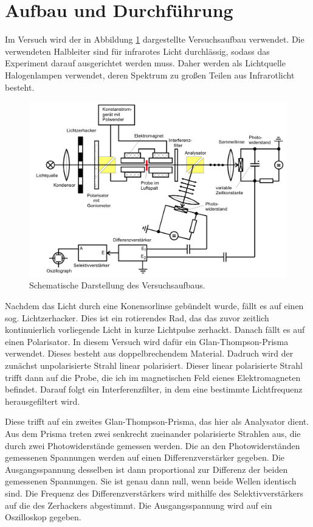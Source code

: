 \section{Aufbau und Durchführung}
\label{sec:aufbauUndDurchfuehrung}

Im Versuch wird der in Abbildung \ref{fig:aufbau} dargestellte Versuchsaufbau verwendet.
Die verwendeten Halbleiter sind für infrarotes Licht durchlässig, sodass das Experiment
darauf ausgerichtet werden muss. Daher werden als Lichtquelle Halogenlampen verwendet,
deren Spektrum zu großen Teilen aus Infrarotlicht besteht.

\begin{figure}
  \centering
  \includegraphics[width=\textwidth]{data/aufbau.png}
  \caption{Schematische Darstellung des Versuchsaufbaus. \cite{anleitung}}
  \label{fig:aufbau}
\end{figure}

Nachdem das Licht durch eine Konensorlinse gebündelt wurde, fällt es auf einen
sog. Lichtzerhacker. Dies ist ein rotierendes Rad, das das zuvor zeitlich kontinuierlich
vorliegende Licht in kurze Lichtpulse zerhackt. Danach fällt es auf einen Polarisator.
In diesem Versuch wird dafür ein Glan-Thompson-Prisma verwendet. Dieses besteht aus
doppelbrechendem Material. Dadruch wird der zunächst unpolarisierte Strahl linear
polarisiert. Dieser linear polarisierte Strahl trifft dann auf die Probe, die ich
im magnetischen Feld eienes Elektromagneten befindet. Darauf folgt ein Interferenzfilter,
in dem eine bestimmte Lichtfrequenz herausgefiltert wird.

Diese trifft auf ein zweites Glan-Thompson-Prisma, das hier als Analysator dient.
Aus dem Prisma treten zwei senkrecht zueinander polarisierte Strahlen aus, die durch zwei
Photowiderstände gemessen werden. Die an den Photowiderständen
gemessenen Spannungen werden auf einen Differenzverstärker gegeben. Die Ausgangsspannung
desselben ist dann proportional zur Differenz der beiden gemessenen Spannungen. Sie
ist genau dann null, wenn beide Wellen identisch sind. Die Frequenz des Differenzverstärkers
wird  mithilfe des Selektivverstärkers auf die des Zerhackers abgestimmt. Die Ausgangsspannung
wird auf ein Oszilloskop gegeben.

